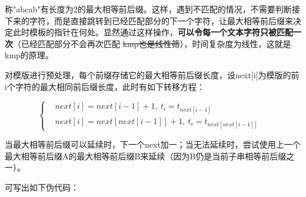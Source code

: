 \documentclass{article}
\begin{document}
	称"abcab"有长度为2的最大相等前后缀。这样，遇到不匹配的情况，不需要判断接下来的字符，而是直接跳转到已经匹配部分的下一个字符，让最大相等前后缀来决定此时模板的指针在何处。显然通过这样操作，\textbf{可以令每一个文本字符只被匹配一次}（已经匹配部分不会再次匹配 \sout{kmp也是线性筛}），时间复杂度为线性，这就是kmp的原理。

	对模版进行预处理，每个前缀存储它的最大相等前后缀长度，设next[i]为模版的前i个字符的最大相同前后缀长度，此时有如下转移方程：

\begin{equation}
	\left\{
		\begin{aligned}
			&next[i] = next[i-1]+1, \ t_i = t_{next[i-1]} &\\
			&next[i] = next[next[i-1]]+1, \ t_i = t_{next[next[i-1]]} &
		\end{aligned}
	\right.
\end{equation}

当最大相等前后缀可以延续时，下一个next加一；当无法延续时，尝试使用上一个最大相等前后缀A的最大相等前后缀B来延续（因为B仍是当前子串相等前后缀之一）。

可写出如下伪代码：

	

	
\end{document}
